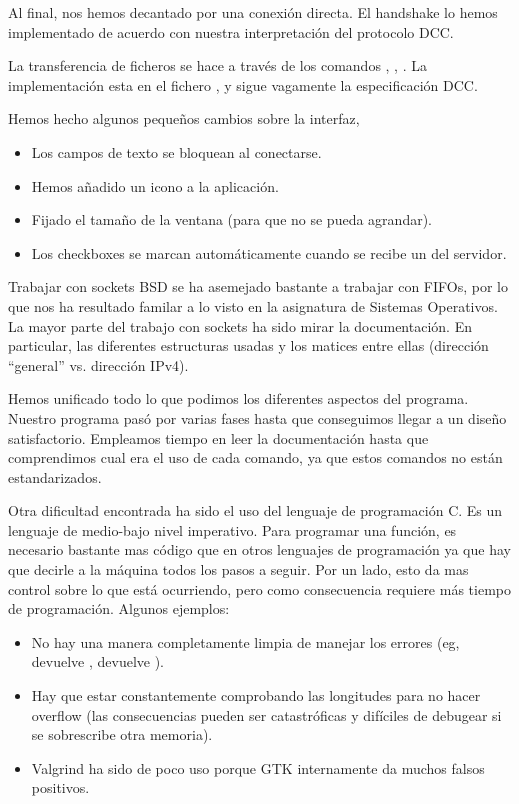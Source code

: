 \documentclass[12pt, a4paper]{memoriaeps}
\begin{document}
Al final, nos hemos decantado por una conexión directa. El handshake lo hemos implementado de acuerdo con nuestra interpretación del protocolo DCC.

La transferencia de ficheros se hace a través de los comandos , , . La implementación esta en el fichero , y sigue vagamente la especificación DCC.

Hemos hecho algunos pequeños cambios sobre la interfaz,
\begin{itemize}
	\item Los campos de texto se bloquean al conectarse.
	\item Hemos añadido un icono a la aplicación.
	\item Fijado el tamaño de la ventana (para que no se pueda agrandar).
	\item Los checkboxes se marcan automáticamente cuando se recibe un  del servidor.
\end{itemize}



Trabajar con sockets BSD se ha asemejado bastante a trabajar con FIFOs, por lo que nos ha resultado familar a lo visto en la asignatura de Sistemas Operativos. La mayor parte del trabajo con sockets ha sido mirar la documentación. En particular, las diferentes estructuras usadas y los matices entre ellas (dirección ``general'' vs. dirección IPv4).

Hemos unificado todo lo que podimos los diferentes aspectos del programa. Nuestro programa pasó por varias fases hasta que conseguimos llegar a un diseño satisfactorio. Empleamos tiempo en leer la documentación hasta que comprendimos cual era el uso de cada comando, ya que estos comandos no están estandarizados.

Otra dificultad encontrada ha sido el uso del lenguaje de programación C. Es un lenguaje de medio-bajo nivel imperativo. Para programar una función, es necesario bastante mas código que en otros lenguajes de programación ya que hay que decirle a la máquina todos los pasos a seguir. Por un lado, esto da mas control sobre lo que está ocurriendo, pero como consecuencia requiere más tiempo de programación. Algunos ejemplos:

\begin{itemize}
	\item No hay una manera completamente limpia de manejar los errores (eg,  devuelve ,  devuelve ).
	\item Hay que estar constantemente comprobando las longitudes para no hacer overflow (las consecuencias pueden ser catastróficas y difíciles de debugear si se sobrescribe otra memoria).
	\item Valgrind ha sido de poco uso porque GTK internamente da muchos falsos positivos.
\end{itemize}
\end{document}
